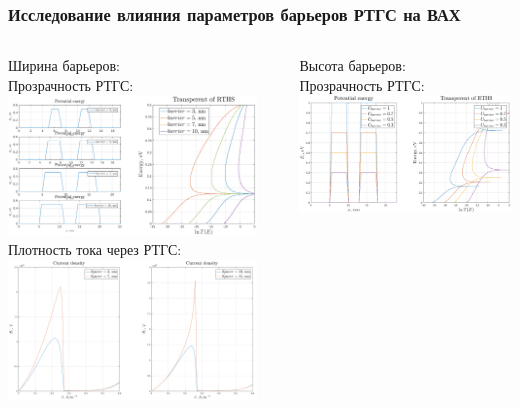 \documentclass[10pt,pdf,hyperref={unicode},aspectratio={169}]{beamer}
\begin{document}
\begin{frame}
	\frametitle{Исследование влияния параметров барьеров РТГС на ВАХ}
	\begin{columns}
		{\color{blue} Ширина барьеров:}\\
		{\color{red} Прозрачность РТГС:}
	   	\includegraphics[width=.86\linewidth,center]{assets/qbwt}\\
		{\color{red} Плотность тока через РТГС:}
	   	\includegraphics[width=.88\linewidth,center]{assets/qbwj}
		\rule[-55mm]{0.2ex}{75mm}
		{\color{blue} Высота барьеров:}\\
		{\color{red}\small Прозрачность РТГС:}\\
	   	\includegraphics[width=.88\linewidth,center]{assets/qwt}\\

\end{columns}
\end{frame}
\end{document}
